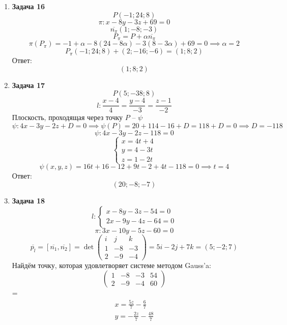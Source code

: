\documentclass{article}
\theoremstyle{plain}
\begin{document}
\begin{enumerate}
\item \textbf{Задача 16}
$$P(-1; 24; 8)$$
$$\pi : x - 8y - 3z + 69 = 0$$
$$\overline{n_\pi}(1; -8; -3)$$
$$P_\pi = P + \alpha \overline{n_\pi}$$
$$\pi(P_\pi) = -1 + \alpha - 8(24 - 8\alpha) - 3(8 - 3\alpha) + 69 = 0 \implies \alpha = 2$$
$$P_\pi (-1; 24; 8) + (2; -16; -6) = (1; 8; 2)$$
Ответ:
$$(1; 8; 2) $$

\item \textbf{Задача 17}
$$P(5; -38; 8)$$
$$l: \frac{x - 4}{4} = \frac{y - 4}{-3} = \frac{z - 1}{-2}$$
Плоскость, проходящая через точку $P$ -- $\psi$
$$ \psi: 4x - 3y - 2z + D = 0 \implies \psi(P) = 20 + 114 - 16 + D = 118 + D = 0 \implies D = -118 $$
$$ \psi : 4x - 3y - 2z - 118 = 0 $$
\begin{equation}
    \begin{cases}
    x = 4t + 4 \\
    y = 4 - 3t \\
    z = 1 - 2t
    \end{cases}
\end{equation}
$$\psi(x, y, z) = 16t + 16 - 12 + 9t - 2 + 4t - 118 = 0\implies t = 4 $$
Ответ:
$$(20; -8; -7)$$

\item \textbf{Задача 18}
\begin{equation}
l:
    \begin{cases}
    x - 8y - 3z - 54 = 0 \\
    2x - 9y - 4z - 64 = 0
    \end{cases}
\end{equation}
$$ \pi: 3x - 10y - 5z - 60 = 0 $$
$$\overline{p_l} = [\overline{n_1}, \overline{n_2}] = \det\begin{pmatrix} i & j & k\\ 1 & -8 & -3 \\ 2 & -9 & -4 \end{pmatrix} = 5i - 2j + 7k = (5; -2; 7) $$
Найдём точку, которая удовлетворяет системе методом Gauss'a:
$$\begin{pmatrix}
    1 & -8 & -3 & 54 \\
    2 & -9 & -4 & 60
    \end{pmatrix}$$
    = 
    \begin{align}
    x = \frac{5z}{7} - \frac{6}{7}\\
    y = -\frac{2z}{7} - \frac{48}{7}
    \end{align} 


\end{enumerate}
\end{document}
